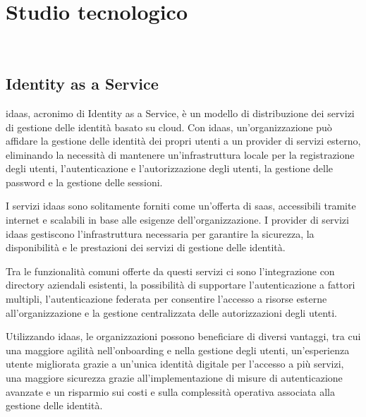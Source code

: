
\chapter{Studio tecnologico}
\label{cap:studio-tecnologico}

\\


\section{Identity as a Service}

\acrshort{idaas}\cite{site:idaas}, acronimo di Identity as a Service, è un modello di distribuzione dei servizi di gestione delle identità basato su cloud. Con \acrshort{idaas}, un'organizzazione può affidare la gestione delle identità dei propri utenti a un provider di servizi esterno, eliminando la necessità di mantenere un'infrastruttura locale per la registrazione degli utenti, l'autenticazione e l'autorizzazione degli utenti, la gestione delle password e la gestione delle sessioni.

I servizi \acrshort{idaas} sono solitamente forniti come un'offerta di \acrfull{saas}, accessibili tramite internet e scalabili in base alle esigenze dell'organizzazione. I provider di servizi \acrshort{idaas} gestiscono l'infrastruttura necessaria per garantire la sicurezza, la disponibilità e le prestazioni dei servizi di gestione delle identità.

Tra le funzionalità comuni offerte da questi servizi ci sono l'integrazione con directory aziendali esistenti, la possibilità di supportare l'autenticazione a fattori multipli, l'autenticazione federata per consentire l'accesso a risorse esterne all'organizzazione e la gestione centralizzata delle autorizzazioni degli utenti.

Utilizzando \acrshort{idaas}, le organizzazioni possono beneficiare di diversi vantaggi, tra cui una maggiore agilità nell'onboarding e nella gestione degli utenti, un'esperienza utente migliorata grazie a un'unica identità digitale per l'accesso a più servizi, una maggiore sicurezza grazie all'implementazione di misure di autenticazione avanzate e un risparmio sui costi e sulla complessità operativa associata alla gestione delle identità.

